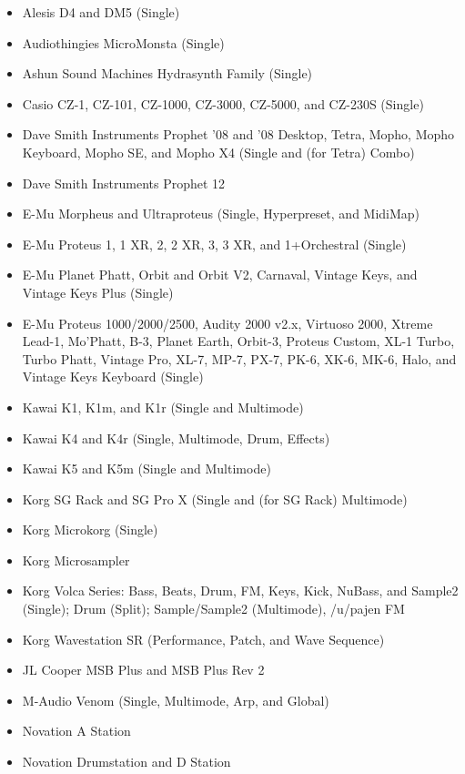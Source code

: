 \documentclass{article}
\begin{document}
{
\small
\begin{multicols}{2}
\begin{flushleft}
\begin{itemize}
\item Alesis D4 and DM5 (Single)
\item Audiothingies MicroMonsta (Single)
\item Ashun Sound Machines Hydrasynth Family (Single)
\item Casio CZ-1, CZ-101, CZ-1000, CZ-3000, CZ-5000, and CZ-230S (Single)
\item Dave Smith Instruments Prophet '08 and '08 Desktop, Tetra, Mopho, Mopho Keyboard, Mopho SE, and Mopho X4 (Single and (for Tetra) Combo)
\item Dave Smith Instruments Prophet 12
\item E-Mu Morpheus and Ultraproteus (Single, Hyperpreset, and MidiMap)
\item E-Mu Proteus 1, 1 XR, 2, 2 XR, 3, 3 XR, and 1+Orchestral (Single)
\item E-Mu Planet Phatt, Orbit and Orbit V2, Carnaval, Vintage Keys, and Vintage Keys Plus (Single)
\item E-Mu Proteus 1000/2000/2500, Audity 2000 v2.x, Virtuoso 2000, Xtreme Lead-1, Mo'Phatt, B-3, Planet Earth, Orbit-3, Proteus Custom, XL-1 Turbo, Turbo Phatt, Vintage Pro, XL-7, MP-7, PX-7, PK-6, XK-6, MK-6, Halo, and Vintage Keys Keyboard (Single)
\item Kawai K1, K1m, and K1r (Single and Multimode)
\item Kawai K4 and K4r (Single, Multimode, Drum, Effects)
\item Kawai K5 and K5m (Single and Multimode)
\item Korg SG Rack and SG Pro X (Single and (for SG Rack) Multimode)
\item Korg Microkorg (Single)
\item Korg Microsampler
\item Korg Volca Series: Bass, Beats, Drum, FM, Keys, Kick, NuBass, and Sample2 (Single); Drum (Split); Sample/Sample2 (Multimode), /u/pajen FM
\item Korg Wavestation SR (Performance, Patch, and Wave Sequence)
\item JL Cooper MSB Plus and MSB Plus Rev 2
\item M-Audio Venom (Single, Multimode, Arp, and Global)
\item Novation A Station
\item Novation Drumstation and D Station

\end{itemize}
\end{flushleft}
\end{multicols}}
\end{document}
